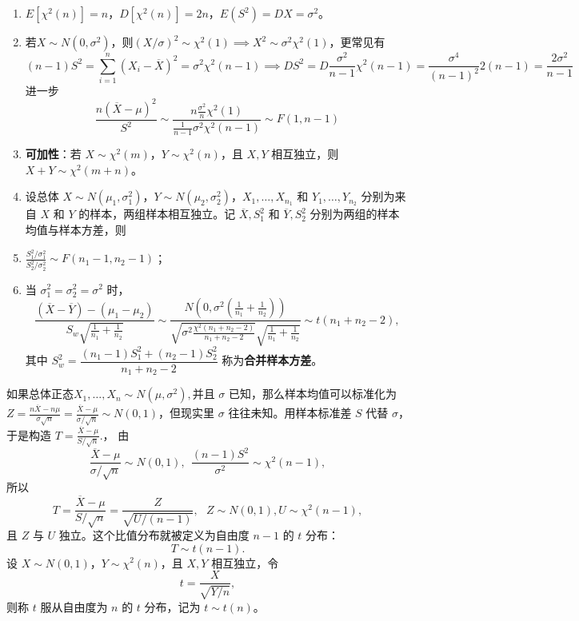 \documentclass[lang=cn,11pt]{elegantbook}
\begin{document}
\begin{property}\label{prop:chi2-property} 
\begin{enumerate}
    \item \(E[\chi^2(n)] = n\)，\(D[\chi^2(n)] = 2n\)，$E(S^2)=DX=\sigma^2$。
    \item 若$X\sim N(0,\sigma^2)$，则$(X/\sigma)^2\sim \chi^2(1)\implies X^2\sim \sigma^2\chi^2(1)$，更常见有\[(n-1)S^2=\sum_{i=1}^n(X_i-\overline{X})^2=\sigma^2\chi^2(n-1)\implies DS^2=D\frac{\sigma^2}{n-1}\chi^2(n-1)=\frac{\sigma^4}{(n-1)^2}2(n-1)=\frac{2\sigma^2}{n-1}\]进一步\[\frac{n(\overline{X}-\mu)^2}{S^2}\sim\frac{n\frac{\sigma^2}{n}\chi^2(1)}{\frac{1}{n-1}\sigma^2\chi^2(n-1)}\sim F(1,n-1)\]
    \item \textbf{可加性}：若 \(X \sim \chi^2(m)\)，\(Y \sim \chi^2(n)\)，且 \(X, Y\) 相互独立，则 \(X + Y \sim \chi^2(m+n)\)。
    \item 设总体 \(X \sim N(\mu_1, \sigma_1^2)\)，\(Y \sim N(\mu_2, \sigma_2^2)\)，\(X_1, \dots, X_{n_1}\) 和 \(Y_1, \dots, Y_{n_2}\) 分别为来自 \(X\) 和 \(Y\) 的样本，两组样本相互独立。记 \(\overline{X}, S_1^2\) 和 \(\overline{Y}, S_2^2\) 分别为两组的样本均值与样本方差，则
    \item \(\displaystyle\frac{S_1^2/\sigma_1^2}{S_2^2/\sigma_2^2} \sim F(n_1-1, n_2-1)\)；
    \item 当 \(\sigma_1^2 = \sigma_2^2 = \sigma^2\) 时，
    \[
    \frac{(\overline{X}-\overline{Y})-(\mu_1-\mu_2)}{S_w\sqrt{\frac{1}{n_1}+\frac{1}{n_2}}}\sim\frac{N(0,\sigma^2(\frac{1}{n_1}+\frac1{n_2}))}{\sqrt{\sigma^2\frac{\chi^2(n_1+n_2-2)}{n_1+n_2-2}}\sqrt{\frac{1}{n_1}+\frac{1}{n_2}}} \sim t(n_1+n_2-2),
    \]
    其中 \(S_w^2 = \dfrac{(n_1-1)S_1^2+(n_2-1)S_2^2}{n_1+n_2-2}\) 称为\textbf{合并样本方差}。
\end{enumerate}
\end{property}

\begin{definition}[\texorpdfstring{\(t\)}{t} 分布] \label{def:t-dist}
如果总体正态\(X_1,\dots,X_n\sim N(\mu,\sigma^2),\)并且 \(\sigma\) 已知，那么样本均值可以标准化为\(Z=\frac{n\overline X-n\mu}{\sigma\sqrt n}=\frac{\overline X-\mu}{\sigma/\sqrt n}\sim N(0,1)\)，但现实里 \(\sigma\) 往往未知。用样本标准差 \(S\) 代替 \(\sigma\)，于是构造
\(
T=\frac{\overline X-\mu}{S/\sqrt n}.
\)，
由
\[
\frac{\overline X-\mu}{\sigma/\sqrt n}\sim N(0,1),~~
\frac{(n-1)S^2}{\sigma^2}\sim \chi^2(n-1),
\]
所以
\[
T=\frac{\overline X-\mu}{S/\sqrt n}=\frac{Z}{\sqrt{U/(n-1)}},
~~~Z\sim N(0,1),U\sim \chi^2(n-1),
\]且 \(Z\) 与 \(U\) 独立。这个比值分布就被定义为自由度 \(n-1\) 的 \(t\) 分布：
\[
T\sim t(n-1).
\]
设 \(X \sim N(0,1)\)，\(Y \sim \chi^2(n)\)，且 \(X, Y\) 相互独立，令
\[
t = \frac{X}{\sqrt{Y/n}},
\]
则称 \(t\) 服从自由度为 \(n\) 的 \(t\) 分布，记为 \(t \sim t(n)\)。
\end{definition}
\end{document}
